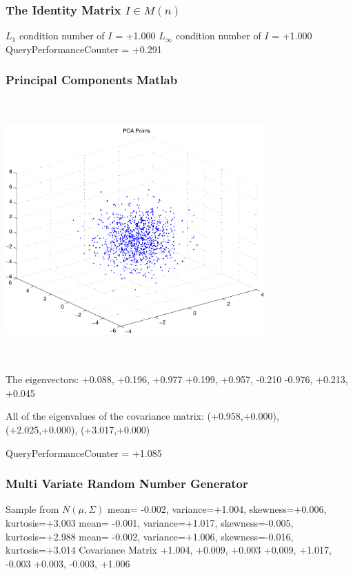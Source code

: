 \documentclass[9pt]{article}
\theoremstyle{plain}
\theoremstyle{definition}
\theoremstyle{remark}
\numberwithin{equation}{section}
\begin{document}
\subsubsection{The Identity Matrix $I \in M(n)$}
$L_1$ condition number of $I$ = +1.000
$L_\infty$ condition number of $I$ = +1.000
QueryPerformanceCounter  =  +0.291
\subsubsection{Principal Components Matlab }
\includegraphics[width=10.0cm,height=10.0cm]{PCAPoints.pdf}

The eigenvectors:
+0.088, +0.196, +0.977
+0.199, +0.957, -0.210
-0.976, +0.213, +0.045

All of the eigenvalues of the covariance matrix:
(+0.958,+0.000), (+2.025,+0.000), (+3.017,+0.000)

QueryPerformanceCounter  =  +1.085
\subsubsection{Multi Variate Random Number Generator }
Sample from $N(\mu,\Sigma)$
mean= -0.002, variance=+1.004, skewness=+0.006, kurtosis=+3.003
mean= -0.001, variance=+1.017, skewness=-0.005, kurtosis=+2.988
mean= -0.002, variance=+1.006, skewness=-0.016, kurtosis=+3.014
Covariance Matrix 
+1.004, +0.009, +0.003
+0.009, +1.017, -0.003
+0.003, -0.003, +1.006
\end{document}
